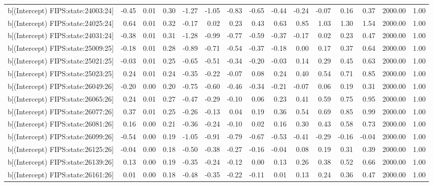 \begin{table}[ht]
\begin{tabular}{rrrrrrrrrrrrrrr}
  b[(Intercept) FIPS:state:24003:24] & -0.45 & 0.01 & 0.30 & -1.27 & -1.05 & -0.83 & -0.65 & -0.44 & -0.24 & -0.07 & 0.16 & 0.37 & 2000.00 & 1.00 \\ 
  b[(Intercept) FIPS:state:24025:24] & 0.64 & 0.01 & 0.32 & -0.17 & 0.02 & 0.23 & 0.43 & 0.63 & 0.85 & 1.03 & 1.30 & 1.54 & 2000.00 & 1.00 \\ 
  b[(Intercept) FIPS:state:24031:24] & -0.38 & 0.01 & 0.31 & -1.28 & -0.99 & -0.77 & -0.59 & -0.37 & -0.17 & 0.02 & 0.23 & 0.47 & 2000.00 & 1.00 \\ 
  b[(Intercept) FIPS:state:25009:25] & -0.18 & 0.01 & 0.28 & -0.89 & -0.71 & -0.54 & -0.37 & -0.18 & 0.00 & 0.17 & 0.37 & 0.64 & 2000.00 & 1.00 \\ 
  b[(Intercept) FIPS:state:25021:25] & -0.03 & 0.01 & 0.25 & -0.65 & -0.51 & -0.34 & -0.20 & -0.03 & 0.14 & 0.29 & 0.45 & 0.63 & 2000.00 & 1.00 \\ 
  b[(Intercept) FIPS:state:25023:25] & 0.24 & 0.01 & 0.24 & -0.35 & -0.22 & -0.07 & 0.08 & 0.24 & 0.40 & 0.54 & 0.71 & 0.85 & 2000.00 & 1.00 \\ 
  b[(Intercept) FIPS:state:26049:26] & -0.20 & 0.00 & 0.20 & -0.75 & -0.60 & -0.46 & -0.34 & -0.21 & -0.07 & 0.06 & 0.19 & 0.31 & 2000.00 & 1.00 \\ 
  b[(Intercept) FIPS:state:26065:26] & 0.24 & 0.01 & 0.27 & -0.47 & -0.29 & -0.10 & 0.06 & 0.23 & 0.41 & 0.59 & 0.75 & 0.95 & 2000.00 & 1.00 \\ 
  b[(Intercept) FIPS:state:26077:26] & 0.37 & 0.01 & 0.25 & -0.26 & -0.13 & 0.04 & 0.19 & 0.36 & 0.54 & 0.69 & 0.85 & 0.99 & 2000.00 & 1.00 \\ 
  b[(Intercept) FIPS:state:26081:26] & 0.16 & 0.00 & 0.21 & -0.36 & -0.24 & -0.10 & 0.02 & 0.16 & 0.30 & 0.43 & 0.58 & 0.73 & 2000.00 & 1.00 \\ 
  b[(Intercept) FIPS:state:26099:26] & -0.54 & 0.00 & 0.19 & -1.05 & -0.91 & -0.79 & -0.67 & -0.53 & -0.41 & -0.29 & -0.16 & -0.04 & 2000.00 & 1.00 \\ 
  b[(Intercept) FIPS:state:26125:26] & -0.04 & 0.00 & 0.18 & -0.50 & -0.38 & -0.27 & -0.16 & -0.04 & 0.08 & 0.19 & 0.31 & 0.39 & 2000.00 & 1.00 \\ 
  b[(Intercept) FIPS:state:26139:26] & 0.13 & 0.00 & 0.19 & -0.35 & -0.24 & -0.12 & 0.00 & 0.13 & 0.26 & 0.38 & 0.52 & 0.66 & 2000.00 & 1.00 \\ 
  b[(Intercept) FIPS:state:26161:26] & 0.01 & 0.00 & 0.18 & -0.48 & -0.35 & -0.22 & -0.11 & 0.01 & 0.13 & 0.24 & 0.36 & 0.47 & 2000.00 & 1.00 \\ 

\end{tabular}
\end{table}
